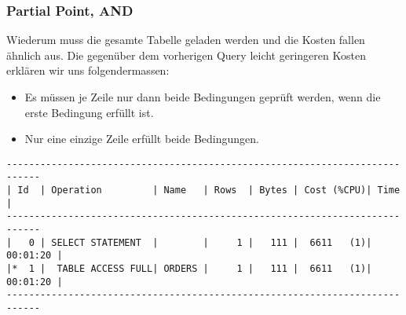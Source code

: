 \documentclass[11pt,a4paper,parskip=half]{scrartcl}
\begin{document}
\subsubsection{Partial Point, AND}
\label{no-idx-sel-partial-and}
Wiederum muss die gesamte Tabelle geladen werden und die Kosten fallen ähnlich aus. Die gegenüber dem vorherigen Query leicht geringeren Kosten erklären wir uns folgendermassen:
\begin{itemize}
	\item Es müssen je Zeile nur dann beide Bedingungen geprüft werden, wenn die erste Bedingung erfüllt ist.
	\item Nur eine einzige Zeile erfüllt beide Bedingungen.
\end{itemize}

\begin{lstlisting}
----------------------------------------------------------------------------                                                                                                                                                                                                                                 
| Id  | Operation         | Name   | Rows  | Bytes | Cost (%CPU)| Time     |                                                                                                                                                                                                                                 
----------------------------------------------------------------------------                                                                                                                                                                                                                                 
|   0 | SELECT STATEMENT  |        |     1 |   111 |  6611   (1)| 00:01:20 |                                                                                                                                                                                                                                 
|*  1 |  TABLE ACCESS FULL| ORDERS |     1 |   111 |  6611   (1)| 00:01:20 |                                                                                                                                                                                                                                 
----------------------------------------------------------------------------                                                                                                                                                                                                                                 
                                                                                                                                                                                                                                                                                                             

\end{lstlisting}
\end{document}
